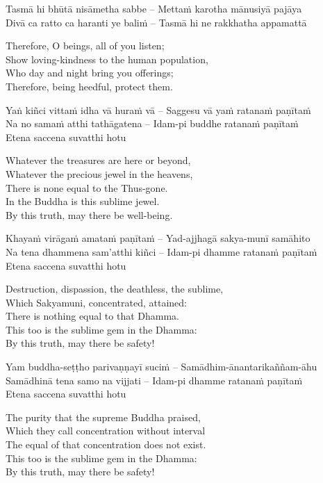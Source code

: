 Tasmā hi bhūtā nisāmetha sabbe – Mettaṁ karotha mānusiyā pajāya\\
Divā ca ratto ca haranti ye baliṁ – Tasmā hi ne rakkhatha appamattā

\begin{english}
  Therefore, O beings, all of you listen;\\
  Show loving-kindness to the human population,\\
  Who day and night bring you offerings;\\
  Therefore, being heedful, protect them.
\end{english}

Yaṅ kiñci vittaṁ idha vā huraṁ vā – Saggesu vā yaṁ ratanaṁ paṇītaṁ\\
Na no samaṁ atthi tathāgatena – Idam-pi buddhe ratanaṁ paṇītaṁ\\
Etena saccena suvatthi hotu

\begin{english}
  Whatever the treasures are here or beyond,\\
  Whatever the precious jewel in the heavens,\\
  There is none equal to the Thus-gone.\\
  In the Buddha is this sublime jewel.\\
  By this truth, may there be well-being.
\end{english}

Khayaṁ virāgaṁ amataṁ paṇītaṁ – Yad-ajjhagā sakya-munī samāhito\\
Na tena dhammena sam'atthi kiñci – Idam-pi dhamme ratanaṁ paṇītaṁ\\
Etena saccena suvatthi hotu

\begin{english}
  Destruction, dispassion, the deathless, the sublime,\\
  Which Sakyamuni, concentrated, attained:\\
  There is nothing equal to that Dhamma.\\
  This too is the sublime gem in the Dhamma:\\
  By this truth, may there be safety!
\end{english}

Yam buddha-seṭṭho parivaṇṇayī suciṁ – Samādhim-ānantarikaññam-āhu\\
Samādhinā tena samo na vijjati – Idam-pi dhamme ratanaṁ paṇītaṁ\\
Etena saccena suvatthi hotu

\begin{english}
  The purity that the supreme Buddha praised,\\
  Which they call concentration without interval\\
  The equal of that concentration does not exist.\\
  This too is the sublime gem in the Dhamma:\\
  By this truth, may there be safety!
\end{english}

